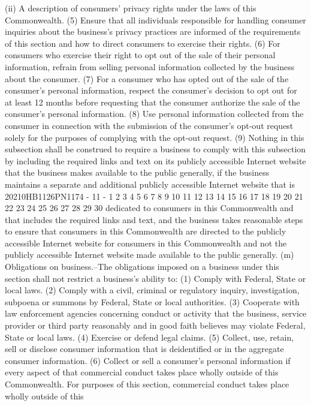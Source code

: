 (ii) A description of consumers' privacy rights
under the laws of this Commonwealth.
(5) Ensure that all individuals responsible for handling
consumer inquiries about the business's privacy practices are
informed of the requirements of this section and how to
direct consumers to exercise their rights.
(6) For consumers who exercise their right to opt out of
the sale of their personal information, refrain from selling
personal information collected by the business about the
consumer.
(7) For a consumer who has opted out of the sale of the
consumer's personal information, respect the consumer's
decision to opt out for at least 12 months before requesting
that the consumer authorize the sale of the consumer's
personal information.
(8) Use personal information collected from the consumer
in connection with the submission of the consumer's opt-out
request solely for the purposes of complying with the opt-out
request.
(9) Nothing in this subsection shall be construed to
require a business to comply with this subsection by
including the required links and text on its publicly
accessible Internet website that the business makes available
to the public generally, if the business maintains a separate
and additional publicly accessible Internet website that is
20210HB1126PN1174 - 11 -
1
2
3
4
5
6
7
8
9
10
11
12
13
14
15
16
17
18
19
20
21
22
23
24
25
26
27
28
29
30
dedicated to consumers in this Commonwealth and that includes
the required links and text, and the business takes
reasonable steps to ensure that consumers in this
Commonwealth are directed to the publicly accessible Internet
website for consumers in this Commonwealth and not the
publicly accessible Internet website made available to the
public generally.
(m) Obligations on business.--The obligations imposed on a
business under this section shall not restrict a business's
ability to:
(1) Comply with Federal, State or local laws.
(2) Comply with a civil, criminal or regulatory inquiry,
investigation, subpoena or summons by Federal, State or local
authorities.
(3) Cooperate with law enforcement agencies concerning
conduct or activity that the business, service provider or
third party reasonably and in good faith believes may violate
Federal, State or local laws.
(4) Exercise or defend legal claims.
(5) Collect, use, retain, sell or disclose consumer
information that is deidentified or in the aggregate consumer
information.
(6) Collect or sell a consumer's personal information if
every aspect of that commercial conduct takes place wholly
outside of this Commonwealth. For purposes of this section,
commercial conduct takes place wholly outside of this

